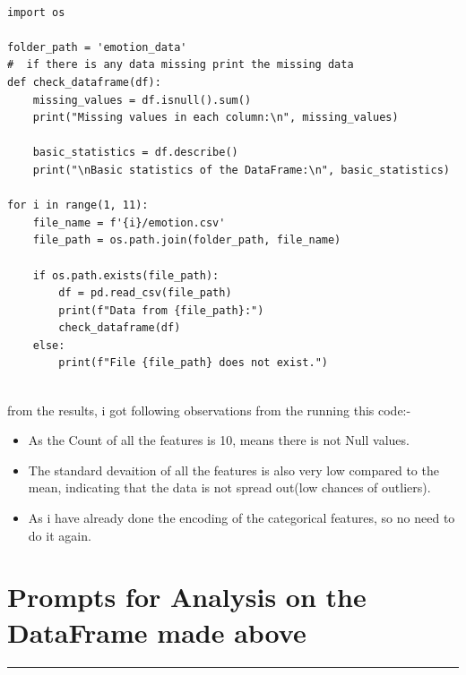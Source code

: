 \documentclass[11pt,a4paper]{article}
\begin{document}
\begin{tcolorbox}
    \begin{verbatim}

import os

folder_path = 'emotion_data'
#  if there is any data missing print the missing data
def check_dataframe(df):
    missing_values = df.isnull().sum()
    print("Missing values in each column:\n", missing_values)
    
    basic_statistics = df.describe()
    print("\nBasic statistics of the DataFrame:\n", basic_statistics)

for i in range(1, 11):
    file_name = f'{i}/emotion.csv'
    file_path = os.path.join(folder_path, file_name)
    
    if os.path.exists(file_path):
        df = pd.read_csv(file_path)
        print(f"Data from {file_path}:")
        check_dataframe(df)
    else:
        print(f"File {file_path} does not exist.")
    
    \end{verbatim}
\end{tcolorbox}

 from the results, i got following observations from the running this code:-
\begin{itemize}
    \item As the Count of all the features is 10, means there is not Null values.
    \item The standard devaition of all the features is also very low compared
    to the mean, indicating that the data is not spread out(low chances of
    outliers).
    \item As i have already done the encoding of the categorical features, so no
    need to do it again.
\end{itemize}


\section{Prompts for Analysis on the DataFrame made above}
\begin{center}
    \color{red}\rule{1\linewidth}{2mm}
\end{center}
\end{document}
